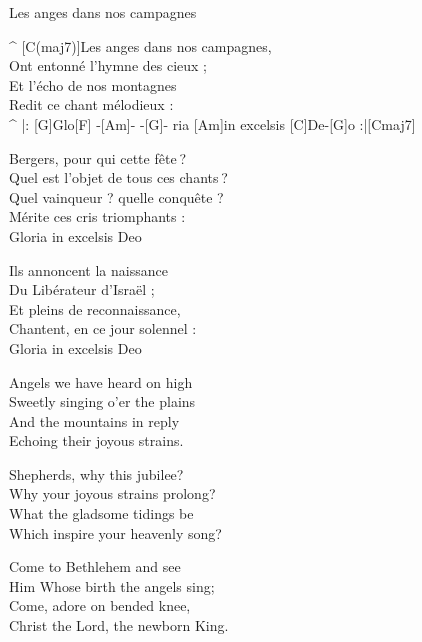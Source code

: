 \begin{song}{Les anges dans nos campagnes}{}

\begin{guitar}
^ [C(maj7)]Les anges dans nos campagnes,\\
Ont entonné l’hymne des cieux ;\\
Et l’écho de nos montagnes\\
Redit ce chant mélodieux :\\
^ |: [G]Glo[F] -[Am]- -[G]- ria [Am]in excelsis [C]De-[G]o :|[Cmaj7]\\
\end{guitar}

\begin{guitar}
Bergers, pour qui cette fête ?\\
Quel est l’objet de tous ces chants ?\\
Quel vainqueur ? quelle conquête ?\\
Mérite ces cris triomphants :\\
Gloria in excelsis Deo\\
\end{guitar}

\begin{guitar}
Ils annoncent la naissance\\
Du Libérateur d’Israël ;\\
Et pleins de reconnaissance,\\
Chantent, en ce jour solennel :\\
Gloria in excelsis Deo\\
\end{guitar}

\begin{guitar}
Angels we have heard on high\\
Sweetly singing o’er the plains\\
And the mountains in reply\\
Echoing their joyous strains.\\
\end{guitar}

\begin{guitar}
Shepherds, why this jubilee?\\
Why your joyous strains prolong?\\
What the gladsome tidings be\\
Which inspire your heavenly song?\\
\end{guitar}

\begin{guitar}
Come to Bethlehem and see\\
Him Whose birth the angels sing;\\
Come, adore on bended knee,\\
Christ the Lord, the newborn King.\\
\end{guitar}

\end{song}
